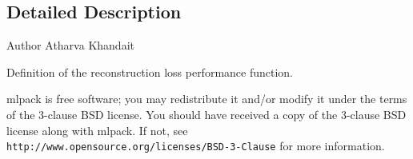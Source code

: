 \subsection{Detailed Description}
\begin{DoxyAuthor}{Author}
Atharva Khandait
\end{DoxyAuthor}
Definition of the reconstruction loss performance function.

mlpack is free software; you may redistribute it and/or modify it under the terms of the 3-\/clause B\+SD license. You should have received a copy of the 3-\/clause B\+SD license along with mlpack. If not, see {\tt http\+://www.\+opensource.\+org/licenses/\+B\+S\+D-\/3-\/\+Clause} for more information. 